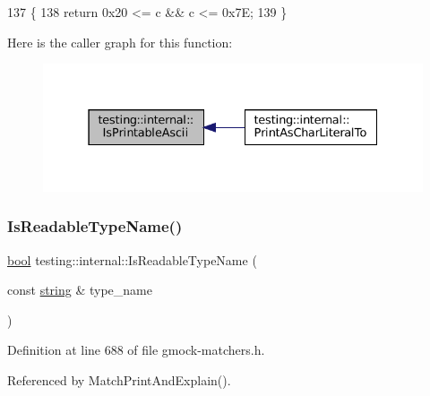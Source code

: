 \begin{DoxyCode}
137                                         \{
138   \textcolor{keywordflow}{return} 0x20 <= c && c <= 0x7E;
139 \}
\end{DoxyCode}
Here is the caller graph for this function\+:
\nopagebreak
\begin{figure}[H]
\begin{center}
\leavevmode
\includegraphics[width=331pt]{namespacetesting_1_1internal_a744a6dd74c12d1e2c16b3c03e14ed4d4_icgraph}
\end{center}
\end{figure}
\mbox{\label{namespacetesting_1_1internal_a19a5d50382569ce6ee94e2b68ddc6fc7}} 
\subsubsection{\texorpdfstring{Is\+Readable\+Type\+Name()}{IsReadableTypeName()}}
{\footnotesize\ttfamily \hyperlink{classbool}{bool} testing\+::internal\+::\+Is\+Readable\+Type\+Name (\begin{DoxyParamCaption}\item[{const \hyperlink{namespacetesting_1_1internal_a8e8ff5b11e64078831112677156cb111}{string} \&}]{type\+\_\+name }\end{DoxyParamCaption})\hspace{0.3cm}{\ttfamily [inline]}}



Definition at line 688 of file gmock-\/matchers.\+h.



Referenced by Match\+Print\+And\+Explain().


